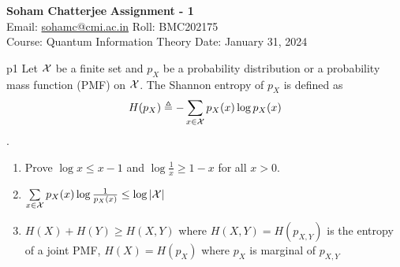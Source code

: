 \documentclass[a4paper, 11pt]{article}
\begin{document}
	
	
	\textsf{\noindent \large\textbf{Soham Chatterjee} \hfill \textbf{Assignment - 1}\\
		Email: \href{sohamc@cmi.ac.in}{sohamc@cmi.ac.in} \hfill Roll: BMC202175\\
		\normalsize Course: Quantum Information Theory \hfill Date: January 31, 2024}
	
	
	\begin{problem}{%
		}{p1%
		}
Let $\mathcal{X}$ be a finite		set and $p_X$ be a probability distribution or a probability mass function (PMF) on $\mathcal{X}$. The Shannon entropy of $p_X$ is defined as $$H(p_X)\triangleq -\sum_{x\in \mathcal{X}}p_X(x)\log p_X(x)$$.
\begin{enumerate}
	\item Prove $\log x\leq x-1$ and $\log \frac1x\geq 1-x$ for all $x>0$.
	\item $\sum\limits_{x\in \mathcal{X}}p_X(x)\log \frac1{p_X(x)}\leq \log |\mathcal{X}|$
	\item $H(X)+H(Y)\geq H(X,Y)$ where $H(X,Y)=H(p_{X,Y})$ is the entropy of a joint PMF, $H(X)=H(p_X)$ where $p_X$ is marginal of $p_{X,Y}$
\end{enumerate}
	\end{problem}
	
\end{document}

